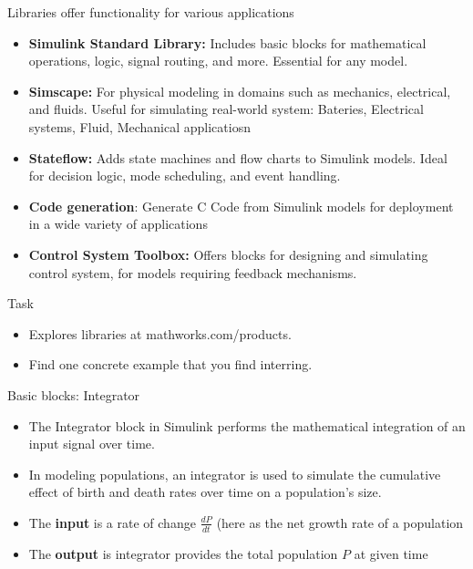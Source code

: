 \begin{frame}{Libraries offer functionality for various applications}

  \begin{itemize}
    \item \textbf{Simulink Standard Library:} Includes basic blocks for mathematical operations, logic, signal routing, and more. Essential for any model.
    \item \textbf{Simscape:} For physical modeling in domains such as mechanics, electrical, and fluids. Useful for simulating real-world system: Bateries, Electrical systems, Fluid, Mechanical applicatiosn
    \item \textbf{Stateflow:} Adds state machines and flow charts to Simulink models. Ideal for decision logic, mode scheduling, and event handling.
    \item \textbf{Code generation}: Generate C Code from Simulink models for deployment in a wide variety of applications
    \item \textbf{Control System Toolbox:} Offers blocks for designing and simulating control system, for models requiring feedback mechanisms.
  \end{itemize}
  

\end{frame}
\begin{frame}{Task}
    \begin{center}
    \Large
    \begin{itemize}
        \item Explores libraries at mathworks.com/products.
        \item Find one concrete example that you find interring.
    \end{itemize}
\end{center}
\end{frame}

\begin{frame}{Basic blocks: Integrator}
\begin{itemize}
    \item The Integrator block in Simulink performs the mathematical integration of an input signal over time.
    \item  In modeling populations, an integrator is used to simulate the cumulative effect of birth and death rates over time on a population's size.
    \item The \textbf{input} is a rate of change $\frac{dP}{dt}$ (here as the net growth rate of a population
    \item The \textbf{output} is integrator provides the total population $P$ at given time
\end{itemize}
\vfill

\begin{center}
\end{center}
\end{frame}


